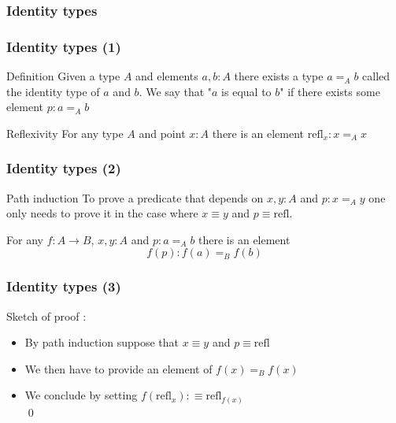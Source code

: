 \documentclass{beamer}
\begin{document}
     \subsubsection{Identity types}
        \begin{frame}
            \frametitle{Identity types (1)} 
            \begin{exampleblock}{Definition}
                Given a type $A$ and elements $a, b : A$ there exists a type $a =_A b$ called the identity type of $a$ and $b$. We say that "$a$ is equal to $b$" if there exists some element $p : a =_A b$ 
            \end{exampleblock}
            \pause
            \begin{exampleblock}{Reflexivity}
                For any type $A$ and point $x : A$ there is an element $\mathrm{refl}_x : x=_A x$
            \end{exampleblock}
        \end{frame}
        \begin{frame}
            \frametitle{Identity types (2)}
            \begin{alertblock}{Path induction}
                To prove a predicate that depends on $x,y : A$ and $p : x=_A y$ one only needs to prove it in the case where $x \equiv y$ and $p \equiv \mathrm{refl}$.
            \end{alertblock}
            \pause
            \begin{example}
                For any $f :  A \rightarrow B$, $x,y :A$ and $p : a=_A b$ there is an element $$f(p) : f(a)=_B f(b)$$
            \end{example}
        \end{frame}
        \begin{frame}
            \frametitle{Identity types (3)}
            Sketch of proof : 
            \pause
            \begin{itemize}
                \item By path induction suppose that $x \equiv y$ and $p \equiv \mathrm{refl}$\\
                \pause
                \item We then have to provide an element of $f(x) =_B f(x)$\\
                \pause
                \item We conclude by setting $f(\mathrm{refl}_x) :\equiv \mathrm{refl}_{f(x)}$ 
                \\\qed
            \end{itemize}
        \end{frame}
\end{document}
